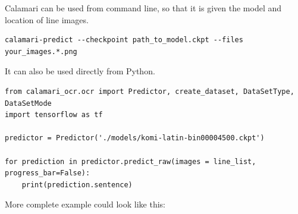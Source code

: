 \documentclass[]{book}
\begin{document}
Calamari can be used from command line, so that it is given the model and location of line images.

\begin{verbatim}
calamari-predict --checkpoint path_to_model.ckpt --files your_images.*.png
\end{verbatim}

It can also be used directly from Python.

\begin{verbatim}
from calamari_ocr.ocr import Predictor, create_dataset, DataSetType, DataSetMode
import tensorflow as tf

predictor = Predictor('./models/komi-latin-bin00004500.ckpt')

for prediction in predictor.predict_raw(images = line_list, progress_bar=False):
    print(prediction.sentence)
\end{verbatim}

More complete example could look like this:
\end{document}
